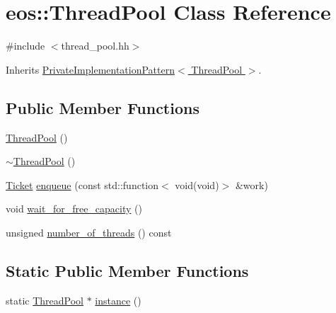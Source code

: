 \hypertarget{classeos_1_1ThreadPool}{
\section{eos::ThreadPool Class Reference}
\label{classeos_1_1ThreadPool}
}


{\ttfamily \#include $<$thread\_\-pool.hh$>$}

Inherits \hyperlink{classeos_1_1PrivateImplementationPattern}{PrivateImplementationPattern$<$ ThreadPool $>$}.\subsection*{Public Member Functions}
\begin{DoxyCompactItemize}
\item 
\hyperlink{classeos_1_1ThreadPool_a0ecd93cf3757d0e087023d42ee30d984}{ThreadPool} ()
\item 
\hyperlink{classeos_1_1ThreadPool_af8929a7e28f8e3d7539a10c026c2588d}{$\sim$ThreadPool} ()
\item 
\hyperlink{classeos_1_1Ticket}{Ticket} \hyperlink{classeos_1_1ThreadPool_aa53eba2596379e9a258930324817a0df}{enqueue} (const std::function$<$ void(void)$>$ \&work)
\item 
void \hyperlink{classeos_1_1ThreadPool_ae5dee2f59b31e15db165313a32c89885}{wait\_\-for\_\-free\_\-capacity} ()
\item 
unsigned \hyperlink{classeos_1_1ThreadPool_ad077ff091504b8e6d73fca55ef41baae}{number\_\-of\_\-threads} () const 
\end{DoxyCompactItemize}
\subsection*{Static Public Member Functions}
\begin{DoxyCompactItemize}
\item 
static \hyperlink{classeos_1_1ThreadPool}{ThreadPool} $\ast$ \hyperlink{classeos_1_1ThreadPool_afcdf38abab1caae94bc6e90b5b5d69bf}{instance} ()
\end{DoxyCompactItemize}


